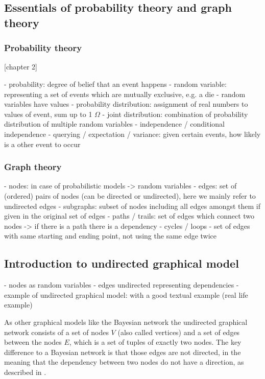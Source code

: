 \subsection{Essentials of probability theory and graph theory}

\subsubsection{Probability theory}
[chapter 2]

- probability: degree of belief that an event happens
- random variable: representing a set of events which are mutually exclusive, e.g. a die
- random variables have values
- probability distribution: assignment of real numbers to values of event, sum up to 1 $\Omega$
- joint distribution: combination of probability distribution of multiple random variables
- independence / conditional independence
- querying / expectation / variance: given certain events, how likely is a other event to occur

\subsubsection{Graph theory}

- nodes: in case of probabilistic models -> random variables
- edges: set of (ordered) pairs of nodes (can be directed or undirected), here we mainly refer to undirected edges
- subgraphs: subset of nodes including all edges amongst them if given in the original set of edges
- paths / trails: set of edges which connect two nodes -> if there is a path there is a dependency
- cycles / loops - set of edges with same starting and ending point, not using the same edge twice

\subsection{Introduction to undirected graphical model}

- nodes as random variables
- edges undirected representing dependencies
- example of undirected graphical model: with a good textual example (real life example)

As other graphical models like the Bayesian network the undirected graphical network consists of a set of nodes $V$ (also called vertices) and a set of edges between the nodes $E$, which is a set of tuples of exactly two nodes. The key difference to a Bayesian network is that those edges are not directed, in the meaning that the dependency between two nodes do not have a direction, as described in \cite{koller2009probabilistic}.

